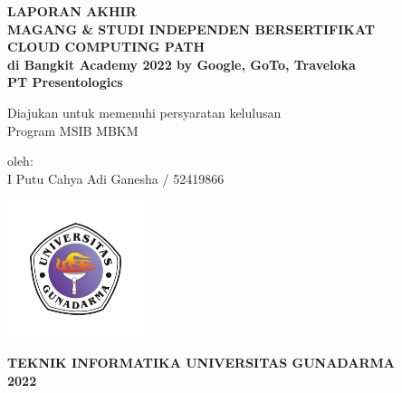 \begin{titlepage}
    \begin{center}
        
        \Large
        \textbf{LAPORAN AKHIR} \\
        \textbf{MAGANG \& STUDI INDEPENDEN BERSERTIFIKAT} \\
        \textbf{CLOUD COMPUTING PATH} \\
        \textbf{di Bangkit Academy 2022 by Google, GoTo, Traveloka} \\
        \textbf{PT Presentologics} \\

        
        \vfill
        
        Diajukan untuk memenuhi persyaratan kelulusan \\
        Program MSIB MBKM
        
        \vfill
        
        \large

        \vfill
        
        \large
 
        
        \begin{center}
            oleh: \\
            I Putu Cahya Adi Ganesha / 52419866
        \end{center}
        
        \vfill
        
        \includegraphics[width=4.0cm]{front/Logo-Gunadarma-Vector-Universitas-Gunadarma.jpg}
        
        \large
        \textbf{TEKNIK INFORMATIKA UNIVERSITAS GUNADARMA} \\
        \textbf{2022}
        
    \end{center}
\end{titlepage}